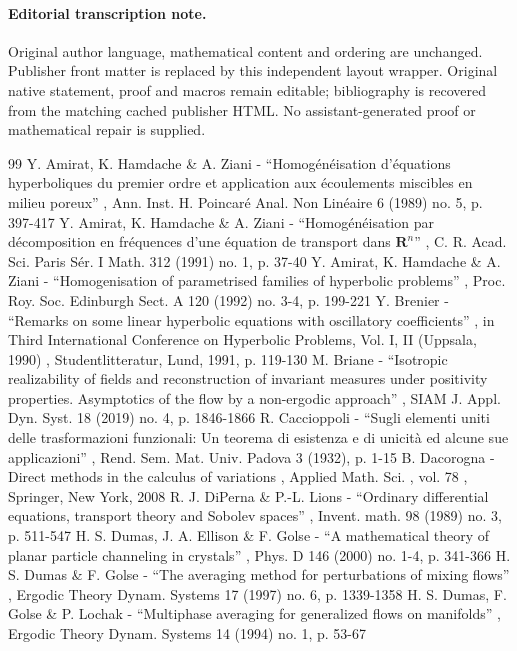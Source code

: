 \documentclass[11pt]{article}
\numberwithin{equation}{section}
\begin{document}
\paragraph{Editorial transcription note.}
Original author language, mathematical content and ordering are unchanged. Publisher front matter is replaced by this independent layout wrapper. Original native statement, proof and macros remain editable; bibliography is recovered from the matching cached publisher HTML. No assistant-generated proof or mathematical repair is supplied.
\clearpage

\begin{thebibliography}{99}
 Y. Amirat, K. Hamdache \& A. Ziani - “Homogénéisation d’équations hyperboliques du premier ordre et application aux écoulements miscibles en milieu poreux” , Ann. Inst. H. Poincaré Anal. Non Linéaire 6 (1989) no. 5, p. 397-417
 Y. Amirat, K. Hamdache \& A. Ziani - “Homogénéisation par décomposition en fréquences d’une équation de transport dans $\mathbf{R}^n$” , C. R. Acad. Sci. Paris Sér. I Math. 312 (1991) no. 1, p. 37-40
 Y. Amirat, K. Hamdache \& A. Ziani - “Homogenisation of parametrised families of hyperbolic problems” , Proc. Roy. Soc. Edinburgh Sect. A 120 (1992) no. 3-4, p. 199-221
 Y. Brenier - “Remarks on some linear hyperbolic equations with oscillatory coefficients” , in Third International Conference on Hyperbolic Problems, Vol. I, II (Uppsala, 1990) , Studentlitteratur, Lund, 1991, p. 119-130
 M. Briane - “Isotropic realizability of fields and reconstruction of invariant measures under positivity properties. Asymptotics of the flow by a non-ergodic approach” , SIAM J. Appl. Dyn. Syst. 18 (2019) no. 4, p. 1846-1866
 R. Caccioppoli - “Sugli elementi uniti delle trasformazioni funzionali: Un teorema di esistenza e di unicità ed alcune sue applicazioni” , Rend. Sem. Mat. Univ. Padova 3 (1932), p. 1-15
 B. Dacorogna - Direct methods in the calculus of variations , Applied Math. Sci. , vol. 78 , Springer, New York, 2008
 R. J. DiPerna \& P.-L. Lions - “Ordinary differential equations, transport theory and Sobolev spaces” , Invent. math. 98 (1989) no. 3, p. 511-547
 H. S. Dumas, J. A. Ellison \& F. Golse - “A mathematical theory of planar particle channeling in crystals” , Phys. D 146 (2000) no. 1-4, p. 341-366
 H. S. Dumas \& F. Golse - “The averaging method for perturbations of mixing flows” , Ergodic Theory Dynam. Systems 17 (1997) no. 6, p. 1339-1358
 H. S. Dumas, F. Golse \& P. Lochak - “Multiphase averaging for generalized flows on manifolds” , Ergodic Theory Dynam. Systems 14 (1994) no. 1, p. 53-67

\end{thebibliography}
\end{document}
